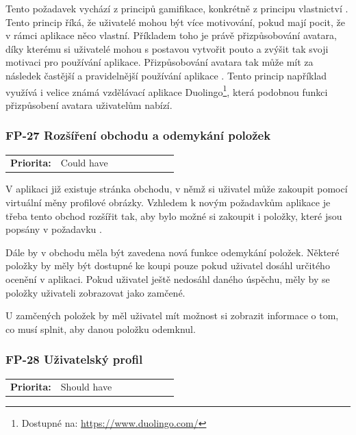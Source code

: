 Tento požadavek vychází z principů gamifikace, konkrétně z principu vlastnictví \cite{Chou2019ActionableGamification}. Tento princip říká, že uživatelé mohou být více motivování, pokud mají pocit, že v rámci aplikace něco vlastní. Příkladem toho je právě přizpůsobování avatara, díky kterému si uživatelé mohou s postavou vytvořit pouto a zvýšit tak svoji motivaci pro používání aplikace. Přizpůsobování avatara tak může mít za následek častější a pravidelnější používání aplikace \cite{Birk2018CombatingAttrition}. Tento princip například využívá i velice známá vzdělávací aplikace Duolingo\footnote{Dostupné na: \href{https://www.duolingo.com/}{https://www.duolingo.com/}}, která podobnou funkci přizpůsobení avatara uživatelům nabízí.

\subsubsection{FP-27 Rozšíření obchodu a odemykání položek}\label{sec:fp-shop-unlock-items}

\begin{tabular}{lp{0.7\linewidth}}
    \textbf{Priorita:} & Could have \\
\end{tabular}

V aplikaci již existuje stránka obchodu, v němž si uživatel může zakoupit pomocí virtuální měny profilové obrázky. Vzhledem k novým požadavkům aplikace je třeba tento obchod rozšířit tak, aby bylo možné si zakoupit i položky, které jsou popsány v požadavku .

Dále by v obchodu měla být zavedena nová funkce odemykání položek. Některé položky by měly být dostupné ke koupi pouze pokud uživatel dosáhl určitého ocenění v aplikaci. Pokud uživatel ještě nedosáhl daného úspěchu, měly by se položky uživateli zobrazovat jako zamčené.

U zamčených položek by měl uživatel mít možnost si zobrazit informace o tom, co musí splnit, aby danou položku odemknul.

\subsubsection{FP-28 Uživatelský profil}
\label{sec:fp-user-profile}

\begin{tabular}{lp{0.7\linewidth}}
    \textbf{Priorita:} & Should have \\
\end{tabular}

